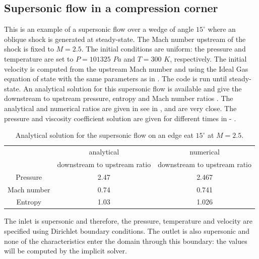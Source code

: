 \subsection{Supersonic flow in a compression corner} \label{sec:corner}
This is an example of a supersonic flow over a wedge of angle $15^{\circ}$ where an oblique shock is generated at steady-state. The Mach number upstream of the shock is fixed to $M=2.5$. The initial conditions are uniform: the pressure and temperature are set to $P=101325$ $Pa$ and $T=300$ $K$, respectively. The initial velocity is computed from the upstream Mach number and using the Ideal Gas equation of state with the same parameters as in . The code is run until steady-state. An analytical solution for this supersonic flow is available and give the downstream to upstream pressure, entropy and Mach number ratios \cite{CompressionCorner}. The analytical and numerical ratios are given in see in , and are very close. The pressure and viscosity coefficient solution are given for different times in  - .
\begin{table}[H]
\begin{center}
 \caption{\label{tbl:corner_exact_sol} Analytical solution for the supersonic flow on an edge eat $15^{\circ}$ at $M=2.5$.}
 \begin{tabular}{|c|c|c|}
 \hline
   & analytical & numerical \\
    & downstream to upstream ratio & downstream to upstream ratio \\
 \hline
Pressure & 2.47 & 2.467\\
  \hline
Mach number  &  0.74 & 0.741\\
   \hline
  Entropy & 1.03 & 1.026\\ \hline 
\end{tabular}
\end{center}
\nonumber
\end{table}
The inlet is supersonic and therefore, the pressure, temperature and velocity are specified using Dirichlet boundary conditions. The outlet is also supersonic and none of the characteristics enter the domain through this boundary: the values will be computed by the implicit solver.
